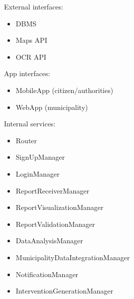 External interfaces:
\begin{itemize}
	\item DBMS
	\item Maps API
	\item OCR API
\end{itemize}

App interfaces:
\begin{itemize}
	\item MobileApp (citizen/authorities)
	\item WebApp (municipality)
\end{itemize}

Internal services:
\begin{itemize}
	\item Router
	\item SignUpManager
	\item LoginManager
	\item ReportReceiverManager
	\item ReportVisualizationManager
	\item ReportValidationManager
	\item DataAnalysisManager
	\item MunicipalityDataIntegrationManager
	\item NotificationManager
	\item InterventionGenerationManager
\end{itemize}